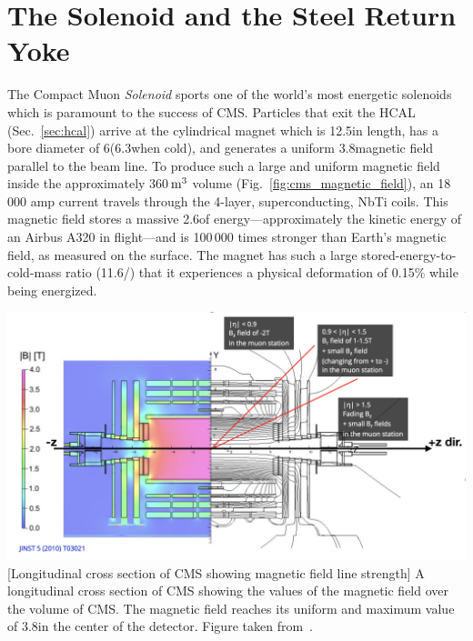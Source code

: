 \section{The Solenoid and the Steel Return Yoke}
\label{sec:solenoid}

The Compact Muon \emph{Solenoid} sports one of the world's most energetic solenoids which is paramount to the success of CMS.
Particles that exit the HCAL (Sec.~\ref{sec:hcal}) arrive at the cylindrical magnet which is 12.5\meter in length, has a bore diameter of 6\meter (6.3\meter when cold), and generates a uniform 3.8\tesla magnetic field parallel to the beam line.
To produce such a large and uniform magnetic field inside the approximately 360$\meter^3$ volume (Fig.~\ref{fig:cms_magnetic_field}), an 18\,000 amp current travels through the 4-layer, superconducting, NbTi coils.
This magnetic field stores a massive 2.6\GJ of energy---approximately the kinetic energy of an Airbus A320 in flight---and is 100\,000 times stronger than Earth's magnetic field, as measured on the surface.
The magnet has such a large stored-energy-to-cold-mass ratio (11.6\KJ/\Kgns) that it experiences a physical deformation of 0.15\% while being energized.
\begin{multiFigure}
    \centering
    \includegraphics[width=\textwidth]{figures/cms/solenoid/CMS_longitudinal_view_magnetic_field.png}
        [Longitudinal cross section of CMS showing magnetic field line strength]
        {A longitudinal cross section of CMS showing the values of the magnetic field over the volume of CMS. 
        The magnetic field reaches its uniform and maximum value of 3.8\tesla in the center of the detector.
        Figure taken from~\cite{Hanneke:2008tm}. %
        }
    \label{fig:cms_magnetic_field}
\end{multiFigure}

